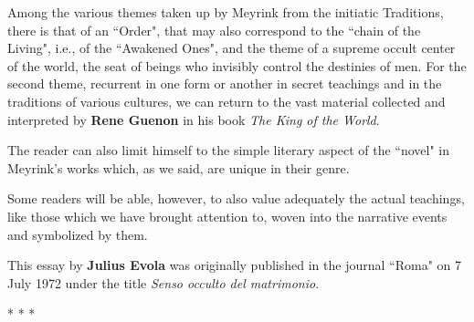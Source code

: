 Among the various themes taken up by Meyrink from the initiatic Traditions, there is that of an ``Order", that may also correspond to the ``chain of the Living", i.e., of the ``Awakened Ones", and the theme of a supreme occult center of the world, the seat of beings who invisibly control the destinies of men. For the second theme, recurrent in one form or another in secret teachings and in the traditions of various cultures, we can return to the vast material collected and interpreted by \textbf{Rene Guenon} in his book \emph{The King of the World}.

The reader can also limit himself to the simple literary aspect of the ``novel" in Meyrink's works which, as we said, are unique in their genre.

Some readers will be able, however, to also value adequately the actual teachings, like those which we have brought attention to, woven into the narrative events and symbolized by them.

\begin{quotex}
This essay by \textbf{Julius Evola} was originally published in the journal ``Roma" on 7 July 1972 under the title \textit{Senso occulto del matrimonio}.
\end{quotex}



\begin{center}* * *\end{center}

